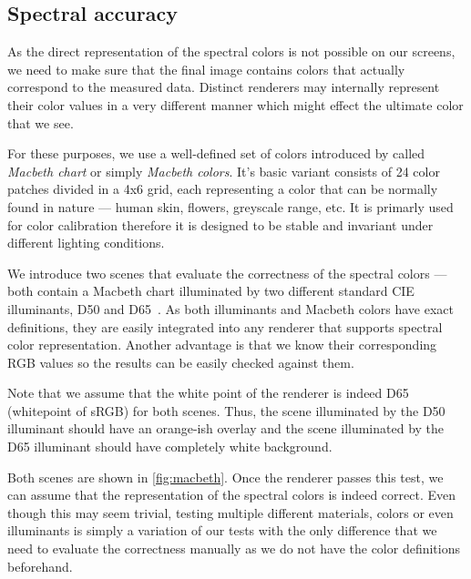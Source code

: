 \subsection{Spectral accuracy}

As the direct representation of the spectral colors is not possible on our screens, we need to make sure that the final image contains colors that actually correspond to the measured data. Distinct renderers may internally represent their color values in a very different manner which might effect the ultimate color that we see.

For these purposes, we use a well-defined set of colors introduced by \citet{mccamy1976color} called \emph{Macbeth chart} or simply \emph{Macbeth colors}. It's basic variant consists of 24 color patches divided in a 4x6 grid, each representing a color that can be normally found in nature --- human skin, flowers, greyscale range, etc. It is primarly used for color calibration therefore it is designed to be stable and invariant under different lighting conditions.

We introduce two scenes that evaluate the correctness of the spectral colors --- both contain a Macbeth chart illuminated by two different standard CIE illuminants, D50 and D65~\cite{cieIlluminants}. As both illuminants and Macbeth colors have exact definitions, they are easily integrated into any renderer that supports spectral color representation. Another advantage is that we know their corresponding RGB values so the results can be easily checked against them.

Note that we assume that the white point of the renderer is indeed D65 (whitepoint of sRGB) for both scenes. Thus, the scene illuminated by the D50 illuminant should have an orange-ish overlay and the scene illuminated by the D65 illuminant should have completely white background.

Both scenes are shown in \autoref{fig:macbeth}. Once the renderer passes this test, we can assume that the representation of the spectral colors is indeed correct. Even though this may seem trivial, testing multiple different materials, colors or even illuminants is simply a variation of our tests with the only difference that we need to evaluate the correctness manually as we do not have the color definitions beforehand.

